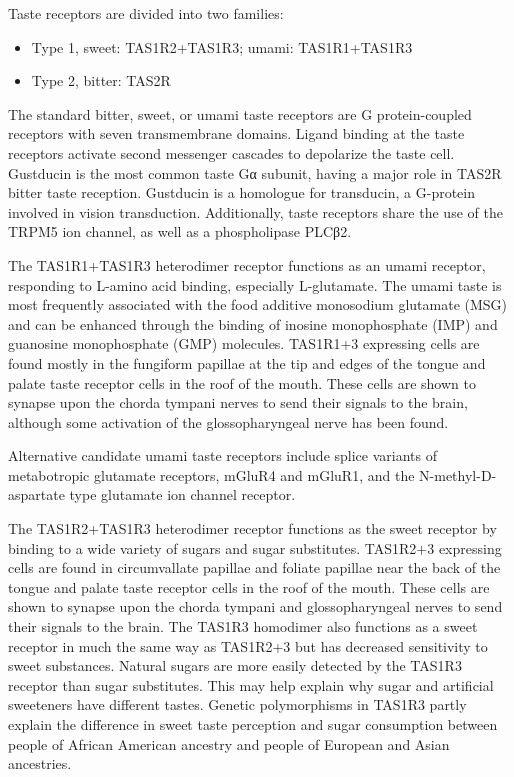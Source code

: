 Taste receptors are divided into two families:

\begin{itemize}
\tightlist
\item
  Type 1, sweet: TAS1R2+TAS1R3; umami: TAS1R1+TAS1R3
\item
  Type 2, bitter: TAS2R
\end{itemize}

The standard bitter, sweet, or umami taste receptors are G
protein-coupled receptors with seven transmembrane domains. Ligand
binding at the taste receptors activate second messenger cascades to
depolarize the taste cell. Gustducin is the most common taste Gα
subunit, having a major role in TAS2R bitter taste reception. Gustducin
is a homologue for transducin, a G-protein involved in vision
transduction. Additionally, taste receptors share the use of the TRPM5
ion channel, as well as a phospholipase PLCβ2.

The TAS1R1+TAS1R3 heterodimer receptor functions as an umami receptor,
responding to L-amino acid binding, especially L-glutamate. The umami
taste is most frequently associated with the food additive monosodium
glutamate (MSG) and can be enhanced through the binding of inosine
monophosphate (IMP) and guanosine monophosphate (GMP) molecules.
TAS1R1+3 expressing cells are found mostly in the fungiform papillae at
the tip and edges of the tongue and palate taste receptor cells in the
roof of the mouth. These cells are shown to synapse upon the chorda
tympani nerves to send their signals to the brain, although some
activation of the glossopharyngeal nerve has been found.

Alternative candidate umami taste receptors include splice variants of
metabotropic glutamate receptors, mGluR4 and mGluR1, and the
N-methyl-D-aspartate type glutamate ion channel receptor.

The TAS1R2+TAS1R3 heterodimer receptor functions as the sweet receptor
by binding to a wide variety of sugars and sugar substitutes. TAS1R2+3
expressing cells are found in circumvallate papillae and foliate
papillae near the back of the tongue and palate taste receptor cells in
the roof of the mouth. These cells are shown to synapse upon the chorda
tympani and glossopharyngeal nerves to send their signals to the brain.
The TAS1R3 homodimer also functions as a sweet receptor in much the same
way as TAS1R2+3 but has decreased sensitivity to sweet substances.
Natural sugars are more easily detected by the TAS1R3 receptor than
sugar substitutes. This may help explain why sugar and artificial
sweeteners have different tastes. Genetic polymorphisms in TAS1R3 partly
explain the difference in sweet taste perception and sugar consumption
between people of African American ancestry and people of European and
Asian ancestries.


